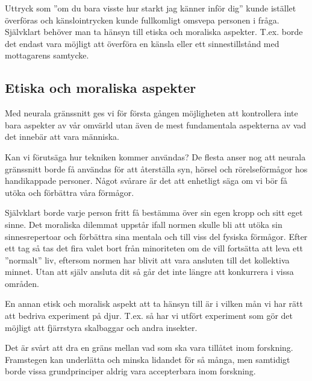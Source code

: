 \documentclass[12pt, a4paper]{article}
\begin{document}
Uttryck som ''om du bara visste hur starkt jag känner inför dig'' kunde istället
överföras och känslointrycken kunde fullkomligt omsvepa personen i fråga.
Självklart behöver man ta hänsyn till etiska och moraliska aspekter. T.ex. borde
det endast vara möjligt att överföra en känsla eller ett sinnestillstånd med
mottagarens samtycke.


\subsection{Etiska och moraliska aspekter}

Med neurala gränssnitt ges vi för första gången möjligheten att kontrollera inte
bara aspekter av vår omvärld utan även de mest fundamentala aspekterna av vad
det innebär att vara människa.

Kan vi förutsäga hur tekniken kommer användas? De flesta anser nog att neurala
gränssnitt borde få användas för att återställa syn, hörsel och rörelseförmågor
hos handikappade personer. Något svårare är det att enhetligt säga om vi bör få
utöka och förbättra våra förmågor.

Självklart borde varje person fritt få bestämma över sin egen kropp och sitt
eget sinne. Det moraliska dilemmat uppstår ifall normen skulle bli att utöka sin
sinnesrepertoar och förbättra sina mentala och till viss del fysiska förmågor.
Efter ett tag så tas det fira valet bort från minoriteten om de vill fortsätta
att leva ett ''normalt'' liv, eftersom normen har blivit att vara ansluten till
det kollektiva minnet. Utan att själv ansluta dit så går det inte längre att
konkurrera i vissa områden. \cite{ethics_eu} \cite{ethics1}

En annan etisk och moralisk aspekt att ta hänsyn till är i vilken mån vi har
rätt att bedriva experiment på djur. T.ex. så har vi utfört experiment som gör
det möjligt att fjärrstyra skalbaggar och andra insekter. \cite{ethics2}

Det är svårt att dra en gräns mellan vad som ska vara tillåtet inom forskning.
Framstegen kan underlätta och minska lidandet för så många, men samtidigt borde
vissa grundprinciper aldrig vara accepterbara inom forskning.






%
%



\pagebreak


\end{document}
